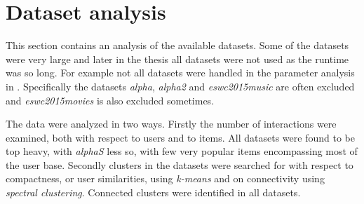 

\section{Dataset analysis}\label{sec:results:data}

This section contains an analysis of the available datasets. Some of the datasets were very large and later in the thesis all datasets were not used as the runtime was so long. For example not all datasets were handled in the parameter analysis in . Specifically the datasets \textit{alpha}, \textit{alpha2} and \textit{eswc2015music} are often excluded and \textit{eswc2015movies} is also excluded sometimes.

The data were analyzed in two ways. Firstly the number of interactions were examined, both with respect to users and to items. All datasets were found to be top heavy, with \textit{alphaS} less so, with few very popular items encompassing most of the user base. Secondly clusters in the datasets were searched for with respect to compactness, or user similarities, using \textit{k-means} and on connectivity using \textit{spectral clustering}. Connected clusters were identified in all datasets.





